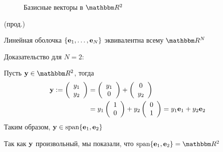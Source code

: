 \begin{frame}

    \begin{figure}
       \begin{center}
        
        \caption{\label{f:vec_canon} Базисные векторы в $\RR^2$}
       \end{center}
    \end{figure}

\end{frame}


\begin{frame}
    
    \vspace{2em}
    \Eg (прод.) 
    
    Линейная оболочка $\{{\mathbf e}_1, \ldots, {\mathbf e}_N\}$ эквивалентна всему $\RR^N$
    
    Доказательство для $N=2$: 
    
    Пусть $\boldy \in \RR^2$, тогда
    \begin{align*}
        {\mathbf y} 
        :=
        \left(
        \begin{array}{c}
            y_1 \\
            y_2
        \end{array}
        \right)
        & =
        \left(
        \begin{array}{c}
            y_1 \\
            0
        \end{array}
        \right)
        +
        \left(
        \begin{array}{c}
            0 \\
            y_2
        \end{array}
        \right)
        \\
        & =
        y_1
        \left(
        \begin{array}{c}
            1 \\
            0
        \end{array}
        \right)
        +
        y_2
        \left(
        \begin{array}{c}
            0 \\
            1
        \end{array}
        \right)
        = y_1 {\mathbf e}_1 + y_2 {\mathbf e}_2
    \end{align*}
    Таким образом, ${\mathbf y} \in \operatorname{span} \{{\mathbf e}_1, {\mathbf e}_2\}$ 
    
    Так как ${\mathbf y}$ произвольный, мы показали, что $\Span \{\bolde_1,
    \bolde_2\} = \RR^2$

\end{frame}


